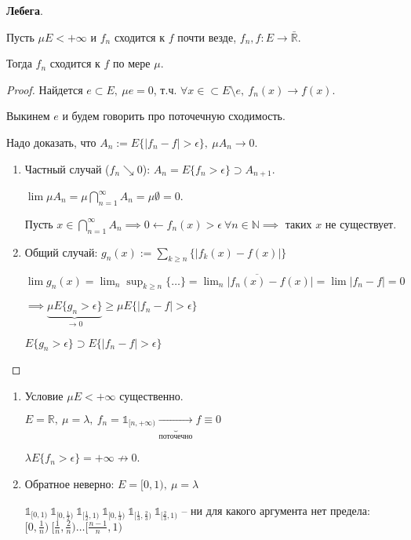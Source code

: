 \begin{theorem}
    \textbf{Лебега}.

    Пусть $\mu E < +\infty$ и $f_n$ сходится к $f$ почти везде, $f_n, f: E \rightarrow \bar{\mathbb{R}}$.

    Тогда $f_n$ сходится к $f$ по мере $\mu$.
\end{theorem}
\begin{proof}
    Найдется $e \subset E, \ \mu e = 0$, т.ч. $\forall x \in \subset E \setminus e, \ f_n(x) \rightarrow f(x)$.

    Выкинем $e$ и будем говорить про поточечную сходимость.

    Надо доказать, что $A_n := E \{ |f_n - f| > \epsilon \}, \ \mu A_n \rightarrow 0$.

    \begin{enumerate}
        \item {
            Частный случай ($f_n \searrow 0$): $A_n = E \{ f_n > \epsilon \} \supset A_{n+1}$.

            $\lim{\mu A_n} = \mu \bigcap_{n=1}^{\infty} A_n = \mu \emptyset = 0$.
            
            Пусть $x \in \bigcap_{n=1}^{\infty} A_n \implies 0 \leftarrow f_n(x) > \epsilon \ \forall n \in \mathbb{N} \implies $ таких $x$ не существует.
        }
        \item {
            Общий случай: $g_n(x) := \sum_{k \geq n} \{ |f_k(x) - f(x)| \}$

            $\lim {g_n(x)} = \lim_{n} \sup_{k \geq n} \{ \dots \} = \overline{\lim_n {|f_n(x) - f(x)|}} = \lim {|f_n - f|} = 0$

            $\implies \underbrace{\mu E \{ g_n > \epsilon \}}_{\rightarrow 0} \geq \mu E \{ |f_n - f| > \epsilon \}$

            $E \{ g_n > \epsilon \} \supset E \{ |f_n - f| > \epsilon \}$
        }
    \end{enumerate}
\end{proof}


\begin{remark}
    \begin{enumerate}
        \item {
            Условие $\mu E < +\infty$ существенно.

            $E = \mathbb{R}, \ \mu = \lambda, \ f_n = \mathbb{1}_{[n, +\infty)} \underbrace{\rightarrow}_{\text{поточечно}} f \equiv 0$

            $\lambda E \{ f_n > \epsilon \} = +\infty \not \rightarrow 0$.
        }
        \item {
            Обратное неверно: $E = [0, 1), \ \mu = \lambda$

            $\mathbb{1}_{[0, 1)} \ \mathbb{1}_{[0, \frac{1}{2})} \ \mathbb{1}_{[\frac{1}{2}, 1)} \ \mathbb{1}_{[0, \frac{1}{3})} \ \mathbb{1}_{[\frac{1}{3}, \frac{2}{3})} \ \mathbb{1}_{[\frac{2}{3}, 1)}$ -- ни для какого аргумента нет предела: $[0, \frac{1}{n}) \ [\frac{1}{n}, \frac{2}{n}) \dots [\frac{n - 1}{n}, 1)$
        }
    \end{enumerate}
\end{remark}


